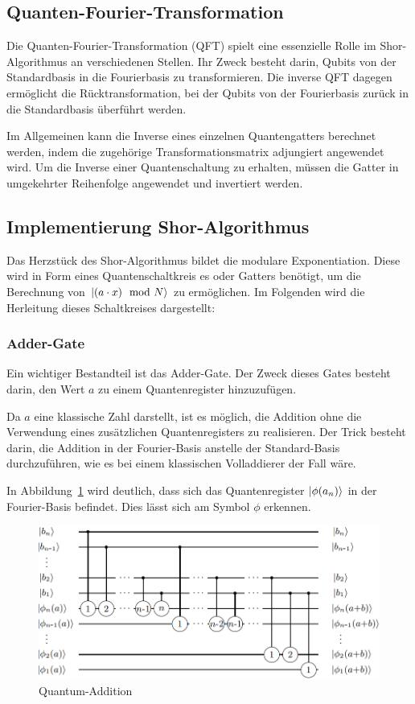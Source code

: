 \documentclass[a4paper,journal]{IEEEtran}
\begin{document}
\subsection{Quanten-Fourier-Transformation}
Die Quanten-Fourier-Transformation (QFT) spielt eine essenzielle Rolle im Shor-Algorithmus
an verschiedenen Stellen.
Ihr Zweck besteht darin, Qubits von der Standardbasis in die Fourierbasis zu transformieren.
Die inverse QFT dagegen ermöglicht die Rücktransformation,
bei der Qubits von der Fourierbasis zurück in die Standardbasis überführt werden.

Im Allgemeinen kann die Inverse eines einzelnen Quantengatters berechnet werden,
indem die zugehörige Transformationsmatrix adjungiert angewendet wird.
Um die Inverse einer Quantenschaltung zu erhalten,
müssen die Gatter in umgekehrter Reihenfolge angewendet und invertiert werden.

\subsection{Implementierung Shor-Algorithmus}
Das Herzstück des Shor-Algorithmus bildet die modulare Exponentiation.
Diese wird in Form eines Quantenschaltkreis es oder Gatters benötigt,
um die Berechnung von \(\ket{(a \cdot x)\mod N}\) zu ermöglichen.
Im Folgenden wird die Herleitung dieses Schaltkreises dargestellt:

\subsubsection{Adder-Gate}
Ein wichtiger Bestandteil ist das Adder-Gate.
Der Zweck dieses Gates besteht darin,
den Wert \(a\) zu einem Quantenregister hinzuzufügen.

Da \(a\) eine klassische Zahl darstellt, ist es möglich,
die Addition ohne die Verwendung eines zusätzlichen Quantenregisters zu realisieren.
Der Trick besteht darin, die Addition in der Fourier-Basis anstelle der Standard-Basis durchzuführen,
wie es bei einem klassischen Volladdierer der Fall wäre.

In Abbildung~\ref{fig:Quantum-Addition} wird deutlich,
dass sich das Quantenregister \(\ket{\phi(a_n)}\) in der Fourier-Basis befindet.
Dies lässt sich am Symbol \(\phi\) erkennen.

\begin{figure}[!h]
\caption{Quantum-Addition~\cite{draper2000addition}}
\label{fig:Quantum-Addition}
\includegraphics[width=\linewidth]{Quantum-Addition.PNG}
\centering
\end{figure}
\end{document}
